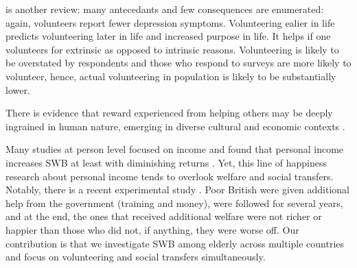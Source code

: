 \documentclass[10pt, letterpaper]{article}
\begin{document}
\begin{spacing}{1.4}
\citet{wilson12B} is another review: many antecedants and few consequences are
enumerated: again, volunteers report fewer depression symptoms. Volunteering
ealier in life predicts volunteering later in life and increased purpose in
life. It helps if one volunteers for extrinsic as opposed to intrinsic reasons. 
Volunteering is likely to be overstated by respondents and those who
respond to surveys are more likely to volunteer, hence, actual volunteering in
population is likely to be substantially lower. %

There is evidence that reward experienced from helping others may be deeply
ingrained in human nature, emerging in diverse cultural and economic contexts \citep{aknin13}.

Many studies at person level focused on income and found that 
personal  income  increases SWB at least with diminishing returns
\citep{aok_ruut_inc_ine,kahneman10,frijters04,kushlev15,dolan08al,veenhoven12}. Yet,
this line of happiness research about personal income tends to overlook welfare
and social transfers.
%
Notably, there is a recent experimental study \citep{oswald14}. Poor British
were given additional help from the government (training and money),  
were followed for several years, and at the end, the ones that received
additional welfare were not richer or happier than those who did not, if anything, they
were worse off. Our contribution is that we  investigate SWB among elderly
across multiple countries and focus on volunteering and social transfers simultaneously.  



\end{spacing}
\end{document}
